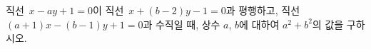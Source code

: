 직선~$x-ay+1=0$이 직선~$x+(b-2)y-1=0$과 평행하고, 직선~$(a+1)x-(b-1)y+1=0$과 수직일 때, 상수 $a$, $b$에 대하여 $a^2+b^2$의 값을 구하시오.
